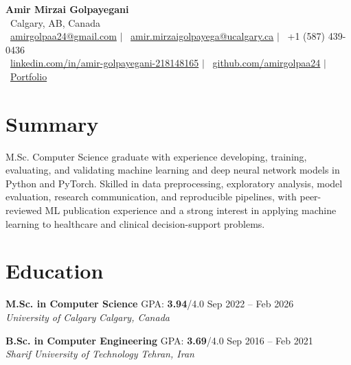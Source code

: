 \documentclass[a4paper,10pt]{article}
\newcommand{\resumeEducationSubheading}[5]{
    \textbf{#1} \hfill #2 \hfill #3 \\
    \textit{#4} \hfill \textit{#5}
}
\begin{document}

\begin{center}
    {\LARGE \textbf{Amir Mirzai Golpayegani}} \\[0.25em]
    \faMapMarker*~Calgary, AB, Canada \\[0.25em]
    \faEnvelope~\href{mailto:amirgolpaa24@gmail.com}{amirgolpaa24@gmail.com}
    $|$
    \faEnvelope~\href{mailto:amir.mirzaigolpayega@ucalgary.ca}{amir.mirzaigolpayega@ucalgary.ca}
    $|$
    \faPhone*~+1 (587) 439-0436 \\[0.25em]
    \faLinkedin~\href{https://linkedin.com/in/amir-golpayegani-218148165}{linkedin.com/in/amir-golpayegani-218148165}
    $|$
    \faGithub~\href{https://github.com/amirgolpaa24}{github.com/amirgolpaa24}
    $|$
    \faGlobe~\href{https://amir-portfolio-navy.vercel.app/}{Portfolio}
\end{center}


\section*{Summary}

M.Sc. Computer Science graduate with experience developing, training, evaluating, and validating machine learning and deep neural network models in Python and PyTorch. Skilled in data preprocessing, exploratory analysis, model evaluation, research communication, and reproducible pipelines, with peer-reviewed ML publication experience and a strong interest in applying machine learning to healthcare and clinical decision-support problems.


\section*{Education}

\resumeEducationSubheading
{M.Sc. in Computer Science}
{GPA: \textbf{3.94}/4.0}
{Sep 2022 -- Feb 2026}
{University of Calgary}
{Calgary, Canada}

\vspace{0.35em}

\resumeEducationSubheading
{B.Sc. in Computer Engineering}
{GPA: \textbf{3.69}/4.0}
{Sep 2016 -- Feb 2021}
{Sharif University of Technology}
{Tehran, Iran}

\end{document}
